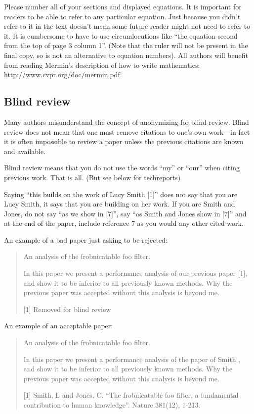 \documentclass[10pt,twocolumn,letterpaper]{article}
\begin{document}
Please number all of your sections and displayed equations.  It is
important for readers to be able to refer to any particular equation.
Just because you didn't refer to it in the text doesn't mean some
future reader might not need to refer to it.  It is cumbersome to have
to use circumlocutions like ``the equation second from the top of page
3 column 1''.  (Note that the ruler will not be present in the final
copy, so is not an alternative to equation numbers).  All authors will
benefit from reading Mermin's description of how to write mathematics:
\url{http://www.cvpr.org/doc/mermin.pdf}.


\subsection{Blind review}

Many authors misunderstand the concept of anonymizing for blind
review.  Blind review does not mean that one must remove citations to
one's own work---in fact it is often impossible to review a paper
unless the previous citations are known and available.

Blind review means that you do not use the words ``my'' or ``our''
when citing previous work.  That is all.  (But see below for
techreports)

Saying ``this builds on the work of Lucy Smith [1]'' does not say that
you are Lucy Smith, it says that you are building on her work.  If you
are Smith and Jones, do not say ``as we show in [7]'', say ``as Smith
and Jones show in [7]'' and at the end of the paper, include reference
7 as you would any other cited work.

An example of a bad paper just asking to be rejected:
\begin{quote}
  \begin{center}
    An analysis of the frobnicatable foo filter.
  \end{center}

  In this paper we present a performance analysis of our previous
  paper [1], and show it to be inferior to all previously known
  methods.  Why the previous paper was accepted without this analysis
  is beyond me.

  [1] Removed for blind review
\end{quote}


An example of an acceptable paper:

\begin{quote}
  \begin{center}
    An analysis of the frobnicatable foo filter.
  \end{center}

  In this paper we present a performance analysis of the paper of
  Smith \etal [1], and show it to be inferior to all previously known
  methods.  Why the previous paper was accepted without this analysis
  is beyond me.

  [1] Smith, L and Jones, C. ``The frobnicatable foo filter, a
  fundamental contribution to human knowledge''.  Nature 381(12),
  1-213.
\end{quote}
\end{document}
